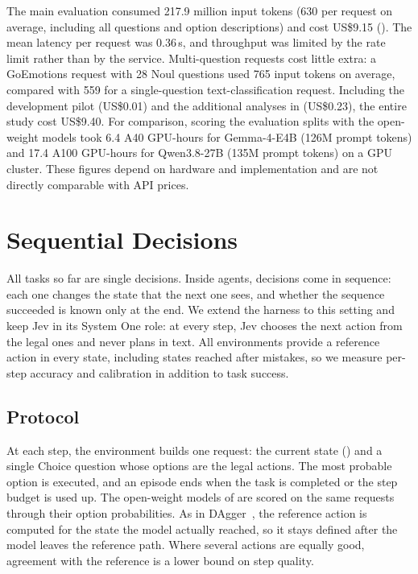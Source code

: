 \documentclass[table]{article}
\begin{document}
The main evaluation consumed 217.9 million input tokens (630 per request on average, including all questions and option descriptions) and cost US\$9.15 (). The mean latency per request was 0.36\,s, and throughput was limited by the rate limit rather than by the service. Multi-question requests cost little extra: a GoEmotions request with 28 Noul questions used 765 input tokens on average, compared with 559 for a single-question text-classification request. Including the development pilot (US\$0.01) and the additional analyses in  (US\$0.23), the entire study cost US\$9.40. For comparison, scoring the evaluation splits with the open-weight models took 6.4 A40 GPU-hours for Gemma-4-E4B (126M prompt tokens) and 17.4 A100 GPU-hours for Qwen3.8-27B (135M prompt tokens) on a GPU cluster. These figures depend on hardware and implementation and are not directly comparable with API prices.


\section{Sequential Decisions}
\label{sec:sequential}

All tasks so far are single decisions. Inside agents, decisions come in sequence: each one changes the state that the next one sees, and whether the sequence succeeded is known only at the end. We extend the harness to this setting and keep Jev in its System One role: at every step, Jev chooses the next action from the legal ones and never plans in text. All environments provide a reference action in every state, including states reached after mistakes, so we measure per-step accuracy and calibration in addition to task success.

\subsection{Protocol}
\label{sec:sequential-protocol}

At each step, the environment builds one request: the current state () and a single Choice question whose options are the legal actions. The most probable option is executed, and an episode ends when the task is completed or the step budget is used up. The open-weight models of  are scored on the same requests through their option probabilities. As in DAgger~\cite{ross2011reduction}, the reference action is computed for the state the model actually reached, so it stays defined after the model leaves the reference path. Where several actions are equally good, agreement with the reference is a lower bound on step quality.
\end{document}
